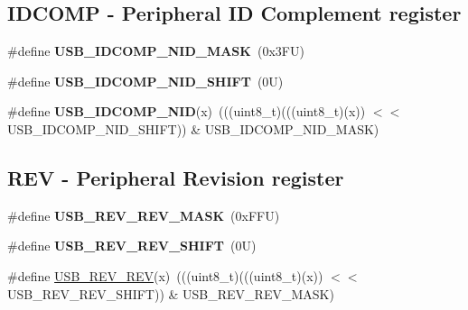 \subsection*{I\+D\+C\+O\+MP -\/ Peripheral ID Complement register}
\begin{DoxyCompactItemize}
\item 
\mbox{\label{group___u_s_b___register___masks_ga91e5cef0c6203ea503c01ecb0f392819}} 
\#define {\bfseries U\+S\+B\+\_\+\+I\+D\+C\+O\+M\+P\+\_\+\+N\+I\+D\+\_\+\+M\+A\+SK}~(0x3\+F\+U)
\item 
\mbox{\label{group___u_s_b___register___masks_gabb5fe5f72dcf289ba2d624ed18f8f07a}} 
\#define {\bfseries U\+S\+B\+\_\+\+I\+D\+C\+O\+M\+P\+\_\+\+N\+I\+D\+\_\+\+S\+H\+I\+FT}~(0\+U)
\item 
\mbox{\label{group___u_s_b___register___masks_ga00f75febd050c5d7be60f755cc502eae}} 
\#define {\bfseries U\+S\+B\+\_\+\+I\+D\+C\+O\+M\+P\+\_\+\+N\+ID}(x)~(((uint8\+\_\+t)(((uint8\+\_\+t)(x)) $<$$<$ U\+S\+B\+\_\+\+I\+D\+C\+O\+M\+P\+\_\+\+N\+I\+D\+\_\+\+S\+H\+I\+FT)) \& U\+S\+B\+\_\+\+I\+D\+C\+O\+M\+P\+\_\+\+N\+I\+D\+\_\+\+M\+A\+SK)
\end{DoxyCompactItemize}
\subsection*{R\+EV -\/ Peripheral Revision register}
\begin{DoxyCompactItemize}
\item 
\mbox{\label{group___u_s_b___register___masks_ga72a356a066674e41e3827b0ccb931e71}} 
\#define {\bfseries U\+S\+B\+\_\+\+R\+E\+V\+\_\+\+R\+E\+V\+\_\+\+M\+A\+SK}~(0x\+F\+F\+U)
\item 
\mbox{\label{group___u_s_b___register___masks_gab058ebe4be52454e46ef15ce015ac5fd}} 
\#define {\bfseries U\+S\+B\+\_\+\+R\+E\+V\+\_\+\+R\+E\+V\+\_\+\+S\+H\+I\+FT}~(0\+U)
\item 
\#define \mbox{\hyperlink{group___u_s_b___register___masks_ga30e7698a3bfac84ce89aee7d2d0498f4}{U\+S\+B\+\_\+\+R\+E\+V\+\_\+\+R\+EV}}(x)~(((uint8\+\_\+t)(((uint8\+\_\+t)(x)) $<$$<$ U\+S\+B\+\_\+\+R\+E\+V\+\_\+\+R\+E\+V\+\_\+\+S\+H\+I\+FT)) \& U\+S\+B\+\_\+\+R\+E\+V\+\_\+\+R\+E\+V\+\_\+\+M\+A\+SK)
\end{DoxyCompactItemize}

